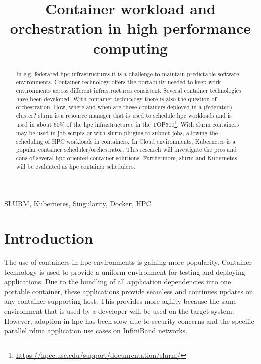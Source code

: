 \documentclass[conference]{IEEEtran}
\begin{document}
\title{Container workload and orchestration in high performance computing}

\author{
}

\maketitle

\begin{abstract}
In e.g. federated \gls{hpc} infrastructures it is a challenge to maintain predictable software environments. Container technology offers the portability needed to keep work environments across different infrastructures consistent. Several container technologies have been developed. With container technology there is also the question of orchestration. How, where and when are these containers deployed in a  (federated) cluster? \gls{slurm} is a resource manager that is used to schedule \gls{hpc} workloads and is used in about 60\% of the \gls{hpc} infrastructures in the TOP500\footnote{\url{https://hpcc.usc.edu/support/documentation/slurm/}}. With \gls{slurm} containers may be used in job scripts or with \gls{slurm} plugins to submit jobs, allowing the scheduling of HPC workloads in containers. In Cloud environments, Kubernetes is a popular container scheduler/orchestrator. This research will investigate the pros and cons of several \gls{hpc} oriented container solutions. Furthermore, \gls{slurm} and Kubernetes will be evaluated as \gls{hpc} container schedulers.
\end{abstract}

\begin{IEEEkeywords}
SLURM, Kubernetes, Singularity, Docker, HPC
\end{IEEEkeywords}


\section{Introduction}
\label{introduction}
The use of containers in \gls{hpc} environments is gaining more popularity. Container technology is used to provide a uniform environment for testing and deploying applications. Due to the bundling of all application dependencies into one portable container, these applications provide seamless and continues updates on any container-supporting host. This provides more agility because the same environment that is used by a developer will be used on the target system. However, adoption in \gls{hpc} has been slow due to security concerns and the specific parallel \gls{rdma} application use cases on InfiniBand networks.
\end{document}
